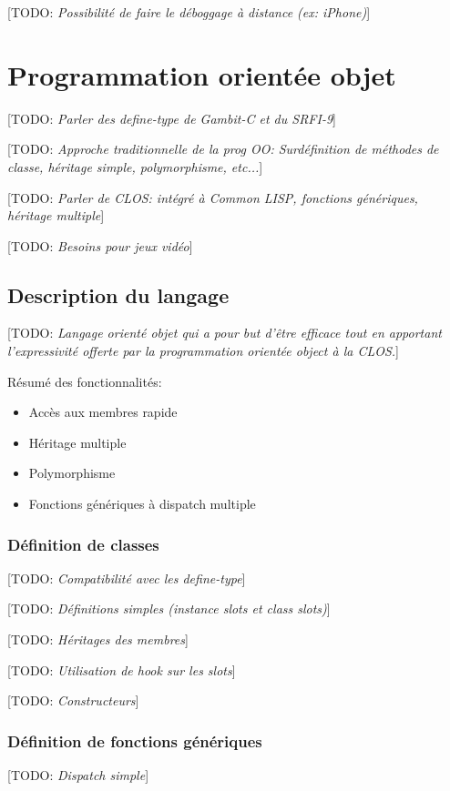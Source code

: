 \documentclass[12pt,oneside,letterpaper,francais]{book}
\newcommand{\todo}[1]{[TODO: {\it #1}]}
\begin{document}
\todo{Possibilité de faire le déboggage à distance (ex: iPhone)}



\chapter{Programmation orientée objet}

\todo{Parler des define-type de Gambit-C et du SRFI-9}

\todo{Approche traditionnelle de la prog OO: Surdéfinition de méthodes de
  classe, héritage simple, polymorphisme, etc...}

\todo{Parler de CLOS: intégré à Common LISP, fonctions génériques, héritage
  multiple}

\todo{Besoins pour jeux vidéo}

\section{Description du langage}
\todo{Langage orienté objet qui a pour but d'être efficace tout en
  apportant l'expressivité offerte par la programmation orientée
  object à la CLOS.}

Résumé des fonctionnalités:
\begin{itemize}
\item Accès aux membres rapide
\item Héritage multiple
\item Polymorphisme
\item Fonctions génériques à \og dispatch \fg multiple
\end{itemize}

\subsection{Définition de classes}
\todo{Compatibilité avec les define-type}

\todo{Définitions simples (instance slots et class slots)}

\todo{Héritages des membres}

\todo{Utilisation de hook sur les slots}

\todo{Constructeurs}


\subsection{Définition de fonctions génériques}
\todo{Dispatch simple}
\end{document}
